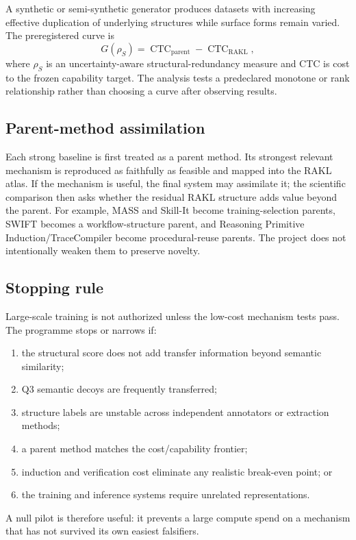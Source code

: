 A synthetic or semi-synthetic generator produces datasets with increasing effective duplication of underlying structures while surface forms remain varied. The preregistered curve is
\[
G(\rho_S)=\operatorname{CTC}_{\mathrm{parent}}-\operatorname{CTC}_{\mathrm{RAKL}},
\]
where $\rho_S$ is an uncertainty-aware structural-redundancy measure and CTC is cost to the frozen capability target. The analysis tests a predeclared monotone or rank relationship rather than choosing a curve after observing results.

\subsection{Parent-method assimilation}

Each strong baseline is first treated as a parent method. Its strongest relevant mechanism is reproduced as faithfully as feasible and mapped into the RAKL atlas. If the mechanism is useful, the final system may assimilate it; the scientific comparison then asks whether the residual RAKL structure adds value beyond the parent. For example, MASS and Skill-It become training-selection parents, SWIFT becomes a workflow-structure parent, and Reasoning Primitive Induction/TraceCompiler become procedural-reuse parents. The project does not intentionally weaken them to preserve novelty.

\subsection{Stopping rule}

Large-scale training is not authorized unless the low-cost mechanism tests pass. The programme stops or narrows if:
\begin{enumerate}[leftmargin=*]
\item the structural score does not add transfer information beyond semantic similarity;
\item Q3 semantic decoys are frequently transferred;
\item structure labels are unstable across independent annotators or extraction methods;
\item a parent method matches the cost/capability frontier;
\item induction and verification cost eliminate any realistic break-even point; or
\item the training and inference systems require unrelated representations.
\end{enumerate}

A null pilot is therefore useful: it prevents a large compute spend on a mechanism that has not survived its own easiest falsifiers.
